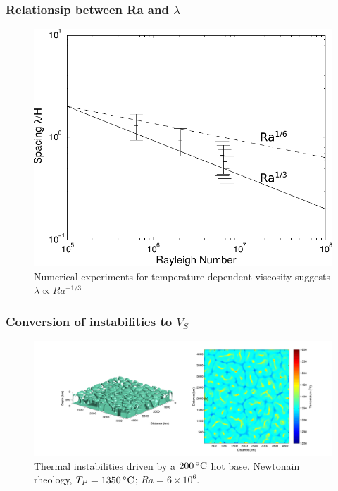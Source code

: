 \documentclass[aspectratio=169]{beamer}
\begin{document}
\begin{frame}
    \frametitle{Relationsip between Ra and $\lambda$}
    \begin{figure}
        \includegraphics[height=0.7\paperheight]{./figures/RaWave-Stag3D.pdf}
        \caption{Numerical experiments for temperature dependent viscosity suggests $\lambda \propto Ra^{-1/3}$}
    \end{figure}
\end{frame}

\begin{frame}
    \frametitle{Conversion of instabilities to $V_{S}$}
    \begin{figure}
        \includegraphics[width=0.85\paperwidth]{./figures/Newt200/dT1.1481_4x4_Newt_Ra6e6_7.png}
        \caption{Thermal instabilities driven by a $200\rm\,^{\circ}C$ hot base. Newtonain rheology, $T_{P}=1350\rm\,^{\circ}C$; $Ra = 6\times10^{6}$.}
    \end{figure}
\end{frame}
\end{document}
